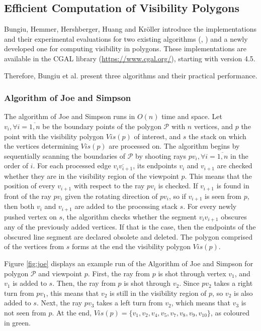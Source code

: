 \subsection{Efficient Computation of Visibility Polygons \cite{DBLP:journals/corr/BungiuHHHK14}}
Bungiu, Hemmer, Hershberger, Huang and Kr\"oller  \cite{DBLP:journals/corr/BungiuHHHK14} introduce the implementations and their experimental evaluations for two existing algorithms (\cite{joe1987corrections}, \cite{asano1985efficient}) and a newly developed one for computing visibility in polygons. These implementations are available in the CGAL library (\url{https://www.cgal.org/}), starting with version 4.5.


Therefore, Bungiu et al. present three algorithms and their practical performance.

\subsubsection{Algorithm of Joe and Simpson \cite{joe1987corrections}}
The algorithm of Joe and Simpson \cite{joe1987corrections} runs in $O(n)$ time and space. Let $v_i, \forall i = \overline{1, n}$ be the boundary points of the polygon $\mathcal P$ with $n$ vertices, and $p$ the point with the visibility polygon $Vis(p)$ of interest, and $s$ the stack on which the vertices determining $Vis(p)$ are processed on. The algorithm begins by sequentially scanning the boundaries of $\mathcal P$ by shooting rays $pv_i, \forall i = \overline{1, n}$ in the order of $i$. For each processed edge $\overline{v_iv_{i + 1}}$, its endpoints $v_i$ and $v_{i + 1}$ are checked whether they are in the visibility region of the viewpoint $p$. This means that the position of every $v_{i + 1}$ with respect to the ray $pv_i$ is checked. If $v_{i + 1}$ is found in front of the ray $pv_i$ given the rotating direction of $pv_i$, so if $v_{i + 1}$ is seen from $p$, then both $v_i$ and $v_{i + 1}$ are added to the processing stack $s$. For every newly pushed vertex on $s$, the algorithm checks whether the segment $v_iv_{i + 1}$ obscures any of the previously added vertices. If that is the case, then the endpoints of the obscured line segment are declared obsolete and deleted. The polygon comprised of the vertices from $s$ forms at the end the visibility polygon $Vis(p)$.

Figure \ref{fig:joe} displays an example run of the Algorithm of Joe and Simpson \cite{joe1987corrections} for polygon $\mathcal P$ and viewpoint $p$. First, the ray from $p$ is shot through vertex $v_1$, and $v_1$ is added to $s$. Then, the ray from $p$ is shot through $v_2$. Since $pv_2$ takes a right turn from $pv_1$, this means that $v_2$ is still in the visibility region of $p$, so $v_2$ is also added to $s$. Next, the ray $pv_3$ takes a left turn from $v_2$, which means that $v_3$ is not seen from $p$. At the end, $Vis(p) = \{v_1, v_2, v_4, v_5, v_7, v_8, v_9, v_{10}\}$, as coloured in green. 

